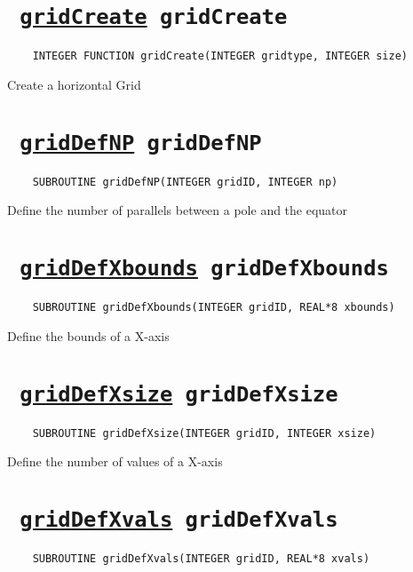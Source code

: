 \section*{\texttt{ 
\ifpdf
\hyperref[gridCreate]{gridCreate}
\else
gridCreate
\fi
}}
\begin{verbatim}
    INTEGER FUNCTION gridCreate(INTEGER gridtype, INTEGER size)
\end{verbatim}

Create a horizontal Grid
\ifpdfoutput{}{(\ref{gridCreate})}


\section*{\texttt{ 
\ifpdf
\hyperref[gridDefNP]{gridDefNP}
\else
gridDefNP
\fi
}}
\begin{verbatim}
    SUBROUTINE gridDefNP(INTEGER gridID, INTEGER np)
\end{verbatim}

Define the number of parallels between a pole and the equator
\ifpdfoutput{}{(\ref{gridDefNP})}


\section*{\texttt{ 
\ifpdf
\hyperref[gridDefXbounds]{gridDefXbounds}
\else
gridDefXbounds
\fi
}}
\begin{verbatim}
    SUBROUTINE gridDefXbounds(INTEGER gridID, REAL*8 xbounds)
\end{verbatim}

Define the bounds of a X-axis
\ifpdfoutput{}{(\ref{gridDefXbounds})}


\section*{\texttt{ 
\ifpdf
\hyperref[gridDefXsize]{gridDefXsize}
\else
gridDefXsize
\fi
}}
\begin{verbatim}
    SUBROUTINE gridDefXsize(INTEGER gridID, INTEGER xsize)
\end{verbatim}

Define the number of values of a X-axis
\ifpdfoutput{}{(\ref{gridDefXsize})}


\section*{\texttt{ 
\ifpdf
\hyperref[gridDefXvals]{gridDefXvals}
\else
gridDefXvals
\fi
}}
\begin{verbatim}
    SUBROUTINE gridDefXvals(INTEGER gridID, REAL*8 xvals)
\end{verbatim}

